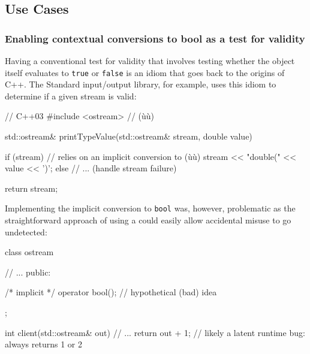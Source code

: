 
\subsection[Use Cases]{Use Cases}\label{use-cases-explicitconv}

\subsubsection[Enabling contextual conversions to {\tt bool} as a test for validity]{Enabling contextual conversions to {\SubsubsecCode bool} as a test for validity}\label{enabling-contextual-conversions-to-bool-as-a-test-for-validity}

Having a conventional test for validity that involves testing whether the object itself evaluates to \lstinline!true! or \lstinline!false! is an idiom that goes back to the
origins of C++. The Standard input/output library, for example, uses this
idiom to determine if a given stream is valid:

\begin{emcppslisting}[language=C++]
// C++03
#include <ostream>  // (ù{}ù)

std::ostream& printTypeValue(std::ostream& stream, double value)
{
    if (stream)  // relies on an implicit conversion to (ù{}ù)
    {
        stream << "double(" << value << ')';
    }
    else
    {
        // ... (handle stream failure)
    }

    return stream;
}
\end{emcppslisting}
    
\noindent Implementing the implicit conversion to \lstinline!bool! was, however,
problematic as the straight\-forward approach of using a
 could easily allow accidental misuse to go
undetected:

\begin{emcppslisting}[language=C++]
class ostream
{
    // ...
  public:

    /* implicit */ operator bool();  // hypothetical (bad) idea
};

int client(std::ostream& out)
{
    // ...
    return out + 1;  // likely a latent runtime bug: always returns 1 or 2
}
\end{emcppslisting}
    
